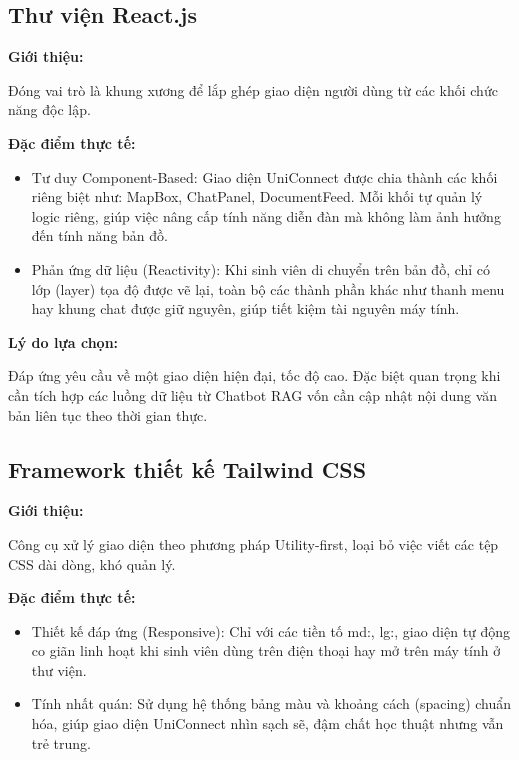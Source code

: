 \subsection{Thư viện React.js}

\textbf{Giới thiệu:} 

Đóng vai trò là khung xương để lắp ghép giao diện người dùng từ các khối chức năng độc lập\cite{banks2022react}.

\textbf{Đặc điểm thực tế:} 

\begin{itemize}
    \item Tư duy Component-Based: Giao diện UniConnect được chia thành các khối riêng biệt như: MapBox, ChatPanel, DocumentFeed. Mỗi khối tự quản lý logic riêng, giúp việc nâng cấp tính năng diễn đàn mà không làm ảnh hưởng đến tính năng bản đồ.

    \item Phản ứng dữ liệu (Reactivity): Khi sinh viên di chuyển trên bản đồ, chỉ có lớp (layer) tọa độ được vẽ lại, toàn bộ các thành phần khác như thanh menu hay khung chat được giữ nguyên, giúp tiết kiệm tài nguyên máy tính.
\end{itemize}

\textbf{Lý do lựa chọn:} 

Đáp ứng yêu cầu về một giao diện hiện đại, tốc độ cao. Đặc biệt quan trọng khi cần tích hợp các luồng dữ liệu từ Chatbot RAG vốn cần cập nhật nội dung văn bản liên tục theo thời gian thực.

\subsection{Framework thiết kế Tailwind CSS}

\textbf{Giới thiệu:} 

Công cụ xử lý giao diện theo phương pháp Utility-first, loại bỏ việc viết các tệp CSS dài dòng, khó quản lý\cite{tailwind2023official}.

\textbf{Đặc điểm thực tế:} 

\begin{itemize}
    \item Thiết kế đáp ứng (Responsive): Chỉ với các tiền tố md:, lg:, giao diện tự động co giãn linh hoạt khi sinh viên dùng trên điện thoại hay mở trên máy tính ở thư viện.

    \item Tính nhất quán: Sử dụng hệ thống bảng màu và khoảng cách (spacing) chuẩn hóa, giúp giao diện UniConnect nhìn sạch sẽ, đậm chất học thuật nhưng vẫn trẻ trung.
\end{itemize}

